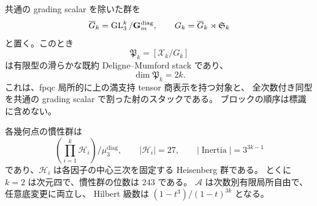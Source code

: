 \begin{theorem}
\label{mbs:thm:presentation-stack}
共通の grading scalar を除いた群を
\[
 \overline G_k=\operatorname{GL}_3^k/\mathbf G_m^{\mathrm{diag}},
 \qquad G_k=\overline G_k\rtimes\mathfrak S_k
\]
と置く。このとき
\begin{equation}\label{mbs:eq:stack}
 \mathfrak P_k=[\mathcal X_k/G_k]
\end{equation}
は有限型の滑らかな既約 Deligne--Mumford stack であり、
\begin{equation}\label{mbs:eq:dimension}
 \dim\mathfrak P_k=2k.
\end{equation}
これは、fpqc 局所的に上の満支持 tensor 商表示を持つ対象と、
全次数付き同型を共通の grading scalar で割った射のスタックである。
ブロックの順序は標識に含めない。

各幾何点の慣性群は
\begin{equation}\label{mbs:eq:inertia}
 \left(\prod_{i=1}^k\mathcal H_i\right)/\mu_3^{\mathrm{diag}},
 \qquad |\mathcal H_i|=27,
 \qquad |\operatorname{Inertia}|=3^{3k-1}
\end{equation}
であり、$\mathcal H_i$ は各因子の中心三次を固定する Heisenberg 群である。
とくに $k=2$ は次元四で、慣性群の位数は $243$ である。
$\mathcal A$ は次数別有限局所自由で、任意底変更に両立し、
Hilbert 級数は $(1-t^3)/(1-t)^{3k}$ となる。
\end{theorem}
